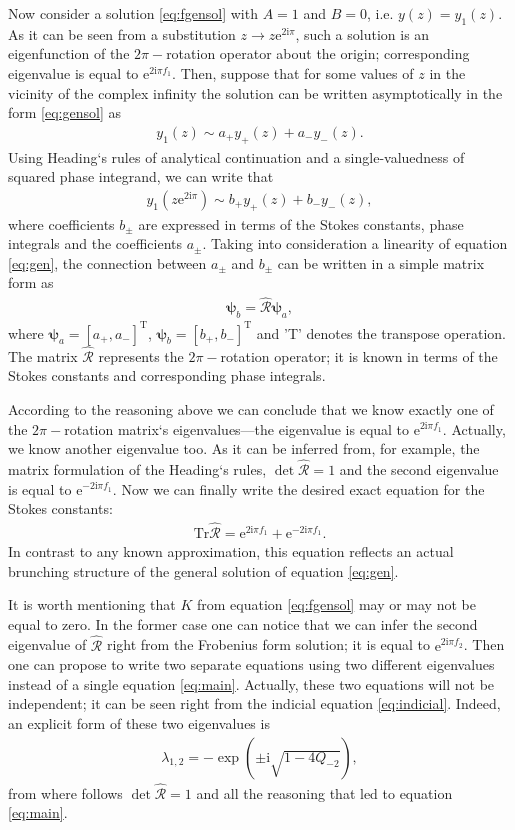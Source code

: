 \documentclass[aip,jmp,reprint]{revtex4-1}
\def\rmi{\mathrm{i}}
\def\rme{\mathrm{e}}
\def\R{\widehat{\mathcal{R}}}
\def\psii{\bm\psi}
\def\T{\mathrm{T}}
\def\Tr{\mathrm{Tr}}
\begin{document}
Now consider a solution \eqref{eq:fgensol} with $A=1$ and $B=0$, i.e. $y(z)=y_1(z)$. 
As it can be seen from a substitution \mbox{$z \rightarrow z \rme^{2 \rmi \pi}$}, 
such a solution is an eigenfunction of the $2\pi-$rotation operator about the origin; 
corresponding eigenvalue is equal to $\rme^{2 \rmi \pi f_1}$.  
Then, suppose that for some values of $z$ in the vicinity of the complex infinity 
the solution can be written asymptotically in the form \eqref{eq:gensol} as
\begin{eqnarray}
y_1(z) \sim a_+y_+(z) + a_-y_-(z).
\end{eqnarray}
Using Heading`s rules of analytical continuation\cite{heading, rwbook} and a single-valuedness 
of squared phase integrand, we can write that
\begin{eqnarray}
y_1(z \rme^{2 \rmi \pi}) \sim b_+y_+(z) + b_-y_-(z),
\end{eqnarray}
where coefficients $b_{\pm}$ are expressed in terms of the Stokes constants, phase integrals and 
the coefficients $a_{\pm}$. Taking into consideration a linearity of equation \eqref{eq:gen}, 
the connection between $a_{\pm}$ and $b_{\pm}$ can be written in a simple matrix form as
\begin{eqnarray}
\psii_b = \R \psii_a,
\end{eqnarray}
where $\psii_a = [{a_+,a_-}]^{\T}$, $\psii_b = [{b_+,b_-}]^{\T}$ and 'T' denotes the transpose operation.
The matrix $\R$ represents the $2\pi-$rotation operator; it is known in terms of
the Stokes constants and corresponding phase integrals. 

According to the reasoning above we can conclude
that we know exactly one of the $2\pi-$rotation matrix`s eigenvalues---the eigenvalue is 
equal to $\rme^{2 \rmi \pi f_1}$. Actually, we know another eigenvalue too. 
As it can be inferred from, for example, the matrix formulation 
of the Heading`s rules\cite{aksymm}, $\det\R=1$ and the second eigenvalue is equal 
to $\rme^{-2 \rmi \pi f_1}$. Now we can finally write the desired exact equation for the Stokes constants:
\begin{eqnarray}
\Tr\R = \rme^{2 \rmi \pi f_1} + \rme^{-2 \rmi \pi f_1}.
\label{eq:main}
\end{eqnarray}
In contrast to any known approximation, this equation reflects an actual brunching structure 
of the general solution of equation \eqref{eq:gen}.

It is worth mentioning that $K$ from equation \eqref{eq:fgensol} may or may not be equal to zero. In the
former case one can notice that we can infer the second eigenvalue of $\R$ right from the
Frobenius form solution; it is equal to $\rme^{2 \rmi \pi f_2}$. Then one can propose to write two
separate equations using two different eigenvalues instead of a single equation \eqref{eq:main}.
Actually, these two equations will not be independent; it can be seen right from the
indicial equation \eqref{eq:indicial}. Indeed, an explicit form of these two eigenvalues is
\begin{eqnarray}
\lambda_{1,2} = - \exp(\pm \rmi \sqrt{1 - 4 Q_{-2}}),
\end{eqnarray}
from where follows $\det\R=1$ and all the reasoning that led to equation \eqref{eq:main}.
\end{document}
